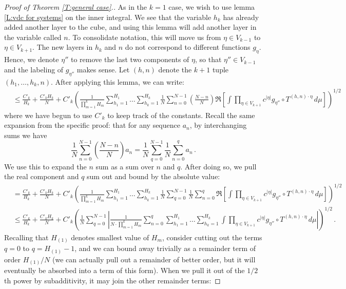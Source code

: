 \documentclass[11pt, oneside]{amsart}   	%
\newcommand{\1}{\mathbbm{1}}
\theoremstyle{definition}
\begin{document}
\begin{proof}[Proof of Theorem \ref{T:general case}.]
As in the $k=1$ case, we wish to use lemma \ref{L:vdc for systems} on the inner integral. We see that the variable $h_k$ has already added another layer to the cube, and using this lemma will add another layer in the variable called $n$. To consolidate notation, this will move us from $\eta\in V_{k-1}$ to $\eta\in V_{k+1}$. The new layers in $h_k$ and $n$ do not correspond to different functions $g_\eta$. Hence, we denote $\eta''$ to remove the last two components of $\eta$, so that $\eta'' \in V_{k-1}$ and the labeling of $g_{\eta''}$ makes sense. Let $(h, n)$ denote the $k+1$ tuple $(h_1, \dots, h_k, n)$. After applying this lemma, we can write:
\begin{align*}
&\leq \frac{C'_k}{H_k} + \frac{C'_kH_k}{N} + C'_k\left(\frac{1}{\prod_{m=1}^{k} H_m} \sum_{h_1 = 1}^{H_1} \dots \sum_{h_{k}=1}^{H_{k}} \frac{1}{N} \sum_{n=0}^{N-1} \left( \frac{N-n}{N} \right) \Re \left[ \int \prod_{\eta\in V_{k+1}} c^{|\eta|} g_{\eta''} \circ T^{(h, n) \cdot \eta} \, d\mu \right]  \right)^{1/2}
\end{align*}
where we have begun to use $C'_k$ to keep track of the constants.
Recall the same expansion from the specific proof: that for any sequence $a_n$, by interchanging sums we have
$$\frac{1}{N}\sum_{n=0}^{N-1} \left( \frac{N-n}{N} \right) a_n = \frac{1}{N}\sum_{q=0}^{N-1} \frac{1}{N}\sum_{n=0}^q a_n\, .$$
We use this to expand the $n$ sum as a sum over $n$ and $q$. After doing so, we pull the real component and $q$ sum out and bound by the absolute value:
\begin{align*}
&= \frac{C'_k}{H_k} + \frac{C'_kH_k}{N} + C'_k\left(\frac{1}{ \prod_{m=1}^{k} H_m} \sum_{h_1 = 1}^{H_1} \dots \sum_{h_{k}=1}^{H_{k}} \frac{1}{N} \sum_{q=0}^{N-1} \frac{1}{N} \sum_{n=0}^{q}  \Re \left[ \int \prod_{\eta\in V_{k+1}} c^{|\eta|} g_{\eta''} \circ T^{(h, n) \cdot \eta} \, d\mu \right]  \right)^{1/2} \\
&\leq  \frac{C'_k}{H_k} + \frac{C'_kH_k}{N} + C'_k \left(\frac{1}{N} \sum_{q=0}^{N-1}  \left|\frac{1}{N \cdot \prod_{m=1}^{k} H_m} \sum_{n=0}^{q} \sum_{h_1 = 1}^{H_1} \dots \sum_{h_{k}=1}^{H_{k}} \int \prod_{\eta\in V_{k+1}} c^{|\eta|} g_{\eta''} \circ T^{(h, n) \cdot \eta} \, d\mu \right|  \right)^{1/2} \, .
\end{align*}
Recalling that $H_{(1)}$ denotes smallest value of $H_m$, consider cutting out the terms $q=0$ to $q = H_{(1)}-1$, and we can bound away trivially as a remainder term of order $H_{(1)}/N$ (we can actually pull out a remainder of better order, but it will eventually be absorbed into a term of this form). When we pull it out of the $1/2$th power by subadditivity, it may join the other remainder terms:


\end{proof}
\end{document}
